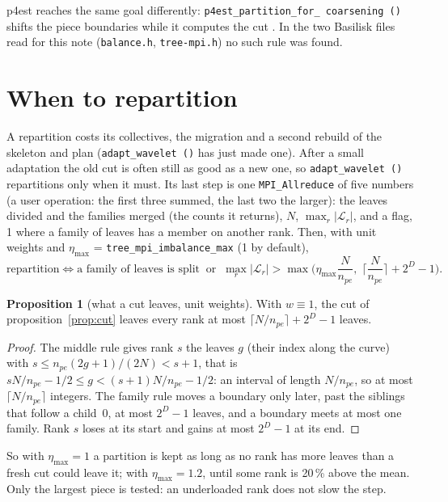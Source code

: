 \documentclass[10pt,a4paper]{article}
\theoremstyle{definition}
\newtheorem{proposition}{Proposition}
\newcommand{\fn}[1]{\texttt{#1}}
\begin{document}
p4est reaches the same goal differently: \fn{p4est\_partition\_for\_%
coarsening ()} shifts the piece boundaries while it computes the cut
\cite{p4est}. In the two Basilisk files read for this note
(\fn{balance.h}, \fn{tree-mpi.h}) no such rule was found.

\section{When to repartition}
\label{sec:when}

A repartition costs its collectives, the migration and a second rebuild of
the skeleton and plan (\fn{adapt\_wavelet ()} has just made one). After a
small adaptation the old cut is often still as good as a new one, so
\fn{adapt\_wavelet ()} repartitions only when it must. Its last step is
one \fn{MPI\_Allreduce} of five numbers (a user operation: the first three
summed, the last two the larger): the leaves divided and the families
merged (the counts it returns), $N$, $\max_r |\mathcal{L}_r|$, and a flag,
1 where a family of leaves has a member on another rank. Then, with unit
weights and $\eta_{\max}$ = \fn{tree\_mpi\_imbalance\_max} (1 by
default),
\[
  \text{repartition} \iff \text{a family of leaves is split}
  \;\;\text{or}\;\; \max_r |\mathcal{L}_r| > \max\Big(\eta_{\max}
  \frac{N}{n_{pe}},\; \Big\lceil \frac{N}{n_{pe}} \Big\rceil + 2^D -
  1\Big).
\]

\begin{proposition}[what a cut leaves, unit weights]
  \label{prop:unitcut}
  With $w \equiv 1$, the cut of proposition~\ref{prop:cut} leaves every
  rank at most $\lceil N/n_{pe} \rceil + 2^D - 1$ leaves.
\end{proposition}

\begin{proof}
  The middle rule gives rank $s$ the leaves $g$ (their index along the
  curve) with $s \le n_{pe}(2g+1)/(2N) < s+1$, that is $sN/n_{pe} - 1/2
  \le g < (s+1)N/n_{pe} - 1/2$: an interval of length $N/n_{pe}$, so at
  most $\lceil N/n_{pe} \rceil$ integers. The family rule moves a boundary
  only later, past the siblings that follow a child~0, at most $2^D - 1$
  leaves, and a boundary meets at most one family. Rank $s$ loses at its
  start and gains at most $2^D - 1$ at its end.
\end{proof}

So with $\eta_{\max} = 1$ a partition is kept as long as no rank has more
leaves than a fresh cut could leave it; with $\eta_{\max} = 1.2$, until
some rank is 20\,\% above the mean. Only the largest piece is tested: an
underloaded rank does not slow the step.
\end{document}
